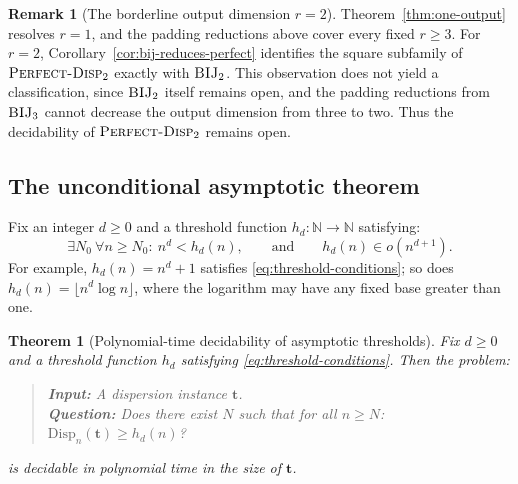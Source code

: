 \documentclass[11pt]{article}
\theoremstyle{definition}
\newtheorem{remark}{Remark}[section]
\theoremstyle{plain}
\newtheorem{theorem}[definition]{Theorem}
\newcommand{\Disp}{\mathrm{Disp}}
\begin{document}
\begin{remark}[The borderline output dimension $r=2$]
Theorem~\ref{thm:one-output} resolves $r=1$, and the padding reductions above cover every fixed $r\ge3$.
For $r=2$, Corollary~\ref{cor:bij-reduces-perfect} identifies the square subfamily of
$\textsc{Perfect-Disp}_2$ exactly with $\textsc{BIJ}_2$.  This observation does not yield a classification,
since $\textsc{BIJ}_2$ itself remains open, and the padding reductions from $\textsc{BIJ}_3$ cannot decrease
the output dimension from three to two.  Thus the decidability of $\textsc{Perfect-Disp}_2$ remains open.
\end{remark}

\subsection{The unconditional asymptotic theorem}
\label{subsec:unconditional-asymptotic}

Fix an integer $d \ge 0$ and a threshold function $h_d: \mathbb{N} \to \mathbb{N}$ satisfying:
\begin{equation}
\label{eq:threshold-conditions}
\exists N_0\ \forall n \ge N_0:\ n^d < h_d(n), \qquad \text{and} \qquad h_d(n) \in o(n^{d+1}).
\end{equation}
For example, $h_d(n) = n^d + 1$ satisfies \eqref{eq:threshold-conditions}; so does
$h_d(n)=\lfloor n^d \log n \rfloor$, where the logarithm may have any fixed base greater than one.

\begin{theorem}[Polynomial-time decidability of asymptotic thresholds]
\label{thm:ptime-threshold}
Fix $d \ge 0$ and a threshold function $h_d$ satisfying \eqref{eq:threshold-conditions}. Then the problem:
\begin{quote}
\textbf{Input:} A dispersion instance $\mathbf t$.\\
\textbf{Question:} Does there exist $N$ such that for all $n \ge N$: $\Disp_n(\mathbf t) \ge h_d(n)$?
\end{quote}
is decidable in polynomial time in the size of $\mathbf t$.
\end{theorem}
\end{document}

